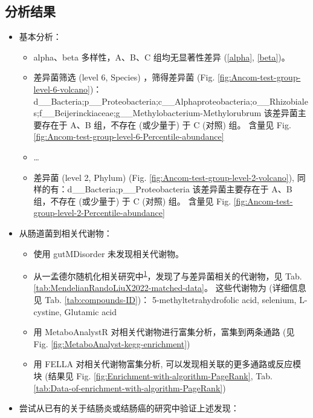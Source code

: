 \documentclass[
]{article}
\providecommand{\tightlist}{%
  \setlength{\itemsep}{0pt}\setlength{\parskip}{0pt}}
\begin{document}
\hypertarget{ux5206ux6790ux7ed3ux679c}{%
\subsection{分析结果}\label{ux5206ux6790ux7ed3ux679c}}

\begin{itemize}
\tightlist
\item
  基本分析：

  \begin{itemize}
  \tightlist
  \item
    alpha、beta 多样性，A、B、C 组均无显著性差异 (\ref{alpha}, \ref{beta})。
  \item
    差异菌筛选 (level 6, Species) ，筛得差异菌 (Fig. \ref{fig:Ancom-test-group-level-6-volcano})：d\_\_Bacteria;p\_\_Proteobacteria;c\_\_Alphaproteobacteria;o\_\_Rhizobiales;f\_\_Beijerinckiaceae;g\_\_Methylobacterium-Methylorubrum
    该差异菌主要存在于 A、B 组，不存在 (或少量于) 于 C (对照) 组。
    含量见 Fig. \ref{fig:Ancom-test-group-level-6-Percentile-abundance}
  \item
    \ldots{}
  \item
    差异菌 (level 2, Phylum) (Fig. \ref{fig:Ancom-test-group-level-2-volcano}), 同样的有：d\_\_Bacteria;p\_\_Proteobacteria
    该差异菌主要存在于 A、B 组，不存在 (或少量于) 于 C (对照) 组。
    含量见 Fig. \ref{fig:Ancom-test-group-level-2-Percentile-abundance}
  \end{itemize}
\item
  从肠道菌到相关代谢物：

  \begin{itemize}
  \tightlist
  \item
    使用 gutMDisorder 未发现相关代谢物。
  \item
    从一孟德尔随机化相关研究中\textsuperscript{\protect\hyperlink{ref-MendelianRandoLiuX2022}{1}}，发现了与差异菌相关的代谢物，见
    Tab. \ref{tab:MendelianRandoLiuX2022-matched-data}。
    这些代谢物为 (详细信息见 Tab. \ref{tab:compounds-ID})：
    5-methyltetrahydrofolic acid, selenium, L-cystine, Glutamic acid
  \item
    用 MetaboAnalystR 对相关代谢物进行富集分析，富集到两条通路 (见 Fig. \ref{fig:MetaboAnalyst-kegg-enrichment})
  \item
    用 FELLA 对相关代谢物富集分析, 可以发现相关联的更多通路或反应模块
    (结果见 Fig. \ref{fig:Enrichment-with-algorithm-PageRank},
    Tab. \ref{tab:Data-of-enrichment-with-algorithm-PageRank})
  \end{itemize}
\item
  尝试从已有的关于结肠炎或结肠癌的研究中验证上述发现：


\end{itemize}
\end{document}
